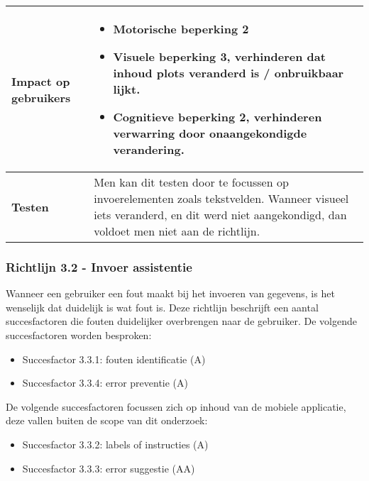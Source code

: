 \begin{table}[H]
\begin{tabular}{|l|p{12cm}|}
        \hline
        \textbf{Impact op gebruikers}         &  
        \begin{itemize}
            \item Motorische beperking 2
            \item Visuele beperking 3, verhinderen dat inhoud plots veranderd is / onbruikbaar lijkt.
            \item Cognitieve beperking 2, verhinderen verwarring door onaangekondigde verandering.
        \end{itemize}                                                                                                                                                                                                                                                                                                     \\ 
        
        \hline
        \textbf{Testen}                       & Men kan dit testen door te focussen op invoerelementen zoals tekstvelden. Wanneer visueel iets veranderd, en dit werd niet aangekondigd, dan voldoet men niet aan de richtlijn.                       \\
        \hline
    \end{tabular}
    
\end{table}
\newpage
\subsubsection{Richtlijn 3.2 - Invoer assistentie}
Wanneer een gebruiker een fout maakt bij het invoeren van gegevens, is het wenselijk dat duidelijk is wat fout is. Deze richtlijn beschrijft een aantal succesfactoren die fouten duidelijker overbrengen naar de gebruiker. De volgende succesfactoren worden besproken: \begin{itemize}
    \item Succesfactor 3.3.1: fouten identificatie (A)
        \item Succesfactor 3.3.4: error preventie (A)
\end{itemize}

De volgende succesfactoren focussen zich op inhoud van de mobiele applicatie, deze vallen buiten de scope van dit onderzoek: \begin{itemize}
     \item Succesfactor 3.3.2: labels of instructies (A)
      \item Succesfactor 3.3.3: error suggestie (AA)
\end{itemize}